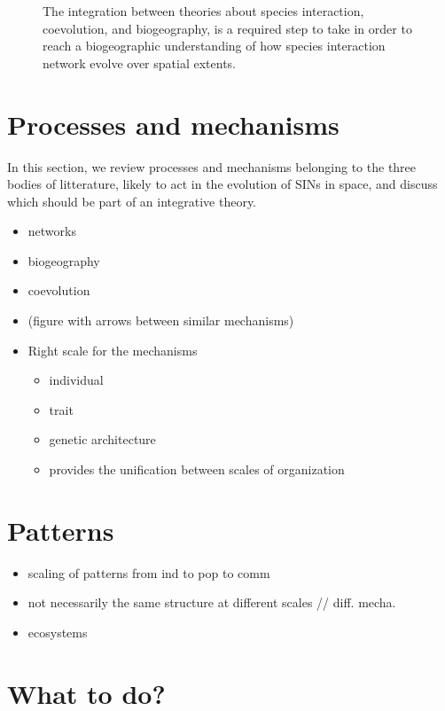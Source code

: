 \documentclass[11pt,oneside]{article}
\begin{document}
\begin{figure}[htbp]
   \centering
   
   \caption{The integration between theories about species interaction, coevolution, and biogeography,
    is a required step to take in order to reach a biogeographic understanding of how species interaction network evolve over
    spatial extents.}
   \label{f:venn}
\end{figure}

\section{Processes and mechanisms}

In this section, we review processes and mechanisms belonging to the three
bodies of litterature, likely to act in the evolution of SINs in space, and
discuss which should be part of an integrative theory.

\begin{itemize}
	\item networks
	\item biogeography 
	\item coevolution
	\item (figure with arrows between similar mechanisms)
	\item Right scale for the mechanisms
		\begin{itemize}
			\item individual
			\item trait
			\item genetic architecture
			\item provides the unification between scales of organization
		\end{itemize}
\end{itemize}

\section{Patterns}

\begin{itemize}
	\item scaling of patterns from ind to pop to comm
	\item not necessarily the same structure at different scales // diff. mecha.
	\item ecosystems
\end{itemize}

\section{What to do?}
\end{document}
